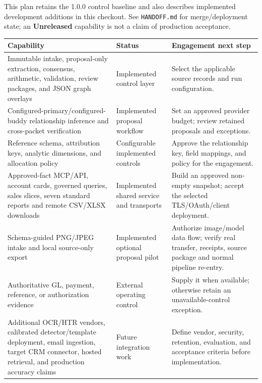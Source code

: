 \documentclass[
]{article}
\newcounter{none} %
\begin{document}
This plan retains the 1.0.0 control baseline and also describes
implemented development additions in this checkout. See
\texttt{HANDOFF.md} for merge/deployment state; an \textbf{Unreleased}
capability is not a claim of production acceptance.

{\def\LTcaptype{none} %
\begin{longtable}[]{@{}
  >{\raggedright\arraybackslash}p{}
  >{\raggedright\arraybackslash}p{}
  >{\raggedright\arraybackslash}p{}@{}}
\toprule\noalign{}
\begin{minipage}[b]{\linewidth}\raggedright
Capability
\end{minipage} & \begin{minipage}[b]{\linewidth}\raggedright
Status
\end{minipage} & \begin{minipage}[b]{\linewidth}\raggedright
Engagement next step
\end{minipage} \\
\midrule\noalign{}
\endhead
\bottomrule\noalign{}
\endlastfoot
Immutable intake, proposal-only extraction, consensus, arithmetic,
validation, review packages, and JSON graph overlays & Implemented
control layer & Select the applicable source records and run
configuration. \\
Configured-primary/configured-buddy relationship inference and
cross-packet verification & Implemented proposal workflow & Set an
approved provider budget; review retained proposals and exceptions. \\
Reference schema, attribution keys, analytic dimensions, and allocation
policy & Configurable implemented controls & Approve the relationship
key, field mappings, and policy for the engagement. \\
Approved-fact MCP/API, account cards, governed queries, sales slices,
seven standard reports and remote CSV/XLSX downloads & Implemented
shared service and transports & Build an approved non-empty snapshot;
accept the selected TLS/OAuth/client deployment. \\
Schema-guided PNG/JPEG intake and local source-only export & Implemented
optional proposal pilot & Authorize image/model data flow; verify real
transfer, receipts, source package and normal pipeline re-entry. \\
Authoritative GL, payment, reference, or authorization evidence &
External operating control & Supply it when available; otherwise retain
an unavailable-control exception. \\
Additional OCR/HTR vendors, calibrated detector/template deployment,
email ingestion, target CRM connector, hosted retrieval, and production
accuracy claims & Future integration work & Define vendor, security,
retention, evaluation, and acceptance criteria before implementation. \\
\end{longtable}
}
\end{document}
